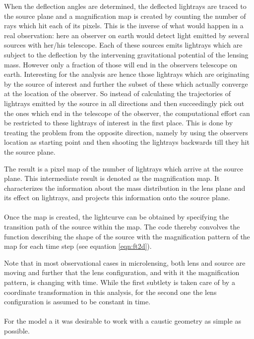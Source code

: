 When the deflection angles are determined, the deflected lightrays are
traced to the source plane and a magnification map is created by
counting the number of rays which hit each of its pixels. This is the
inverse of what would happen in a real observation: here an observer
on earth would detect light emitted by several sources with her/his
telescope. Each of these sources emits lightrays which are subject to
the deflection by the intervening gravitational potential of the
lensing mass. However only a fraction of those will end in the
observers telescope on earth. Interesting for the analysis are hence
those lightrays which are originating by the source of interest and
further the subset of these which actually converge at the location of
the observer. So instead of calculating the trajectories of lightrays
emitted by the source in all directions and then succeedingly pick out
the ones which end in the telescope of the observer, the computational
effort can be restricted to these lightrays of interest in the first
place. This is done by treating the problem from the opposite
direction, namely by using the observers location as starting point
and then shooting the lightrays backwards till they hit the source
plane.

The result is a pixel map of the number of lightrays which arrive at
the source plane. This intermediate result is denoted as the
magnification map. It characterizes the information about the mass
distribution in the lens plane and its effect on lightrays, and
projects this information onto the source plane. \\\\ Once the map is
created, the lightcurve can be obtained by specifying the transition
path of the source within the map. The code thereby convolves the
function describing the shape of the source with the magnification
pattern of the map for each time step (see equation \ref{eqn:ft2d}).

 Note that in most observational cases in microlensing, both lens and
 source are moving and further that the lens configuration, and with
 it the magnification pattern, is changing with time. While the first
 subtlety is taken care of by a coordinate transformation in this
 analysis, for the second one the lens configuration is assumed to be
 constant in time.  \\\\ For the model a it was desirable to work with
 a caustic geometry as simple as possible.


